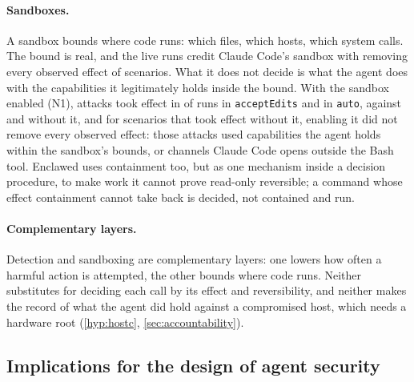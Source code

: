 \documentclass[11pt]{article}
\newcommand{\sys}{Enclawed}
\begin{document}
\paragraph{Sandboxes.} A sandbox bounds where code runs: which files,
which hosts, which system calls. The bound is real, and the live runs
credit Claude Code's sandbox with removing every observed effect of
\SandboxHelpedCount{} scenarios. What it does not decide is what the
agent does with the capabilities it legitimately holds inside the bound.
With the sandbox enabled (N1), attacks took effect in
\SandboxASRacceptEdits{} of runs in \texttt{acceptEdits} and
\SandboxASRauto{} in \texttt{auto}, against \NativeASRacceptEdits{} and
\NativeASRauto{} without it, and for \SandboxNotHelpedCount{} scenarios
that took effect without it, enabling it did not remove every observed
effect: those attacks used capabilities the agent holds within the
sandbox's bounds, or channels Claude Code opens outside the Bash tool.
\sys{} uses containment too, but as one mechanism inside a decision
procedure, to make work it cannot prove read-only reversible; a command
whose effect containment cannot take back is decided, not contained and
run.

\paragraph{Complementary layers.} Detection and sandboxing are
complementary layers: one lowers how often a harmful action is
attempted, the other bounds where code runs. Neither substitutes for
deciding each call by its effect and reversibility, and neither makes
the record of what the agent did hold against a compromised host, which
needs a hardware root (\ref{hyp:hostc}, \cref{sec:accountability}).

\subsection{Implications for the design of agent security}
\label{sec:implications}
\end{document}
